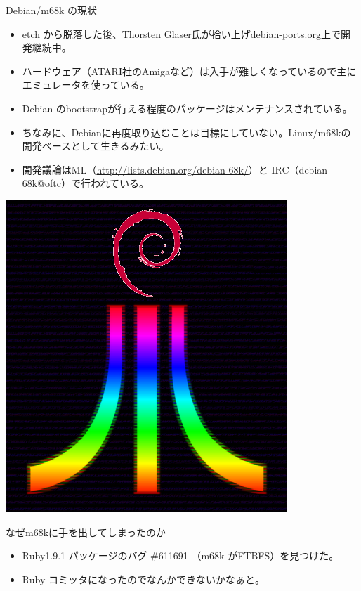\begin{frame}{Debian/m68k の現状}
\begin{minipage}{0.7\hsize}
\begin{itemize}
\item etch から脱落した後、Thorsten Glaser氏が拾い上げdebian-ports.org上で開発継続中。
\item ハードウェア（ATARI社のAmigaなど）は入手が難しくなっているので主に
      エミュレータを使っている。
\item Debian のbootstrapが行える程度のパッケージはメンテナンスされている。
\item ちなみに、Debianに再度取り込むことは目標にしていない。Linux/m68kの
      開発ベースとして生きるみたい。
\item 開発議論はML（\url{http://lists.debian.org/debian-68k/}）と
IRC（debian-68k@oftc）で行われている。
\end{itemize}
\end{minipage}
\begin{minipage}{0.2\hsize}
\includegraphics[width=0.9\hsize]{image201105/dranym.png}
\end{minipage}
\end{frame}

\begin{frame}{なぜm68kに手を出してしまったのか}
\begin{itemize}
\item Ruby1.9.1 パッケージのバグ \#611691 （m68k がFTBFS）を見つけた。
\item Ruby コミッタになったのでなんかできないかなぁと。
\end{itemize}

\end{frame}

